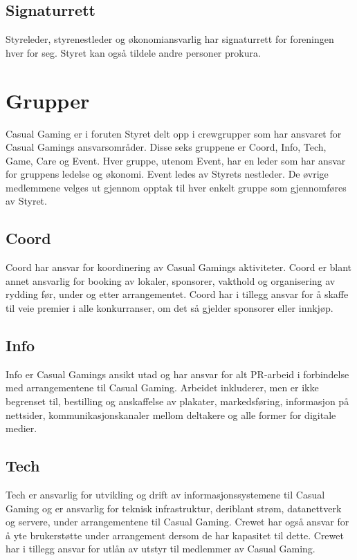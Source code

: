 \subsection{Signaturrett}
Styreleder, styrenestleder og økonomiansvarlig har signaturrett for foreningen hver for seg. Styret kan også tildele andre personer prokura.

\section{Grupper}
Casual Gaming er i foruten Styret delt opp i crewgrupper som har ansvaret for Casual Gamings ansvarsområder. Disse seks gruppene er Coord, Info, Tech, Game, Care og Event. Hver gruppe, utenom Event, har en leder som har ansvar for gruppens ledelse og økonomi. Event ledes av Styrets nestleder. De øvrige medlemmene velges ut gjennom opptak til hver enkelt gruppe som gjennomføres av Styret.

\subsection{Coord}
Coord har ansvar for koordinering av Casual Gamings aktiviteter. Coord er blant annet ansvarlig for booking av lokaler, sponsorer, vakthold og organisering av rydding før, under og etter arrangementet. Coord har i tillegg ansvar for å skaffe til veie premier i alle konkurranser, om det så gjelder sponsorer eller innkjøp.

\subsection{Info}
Info er Casual Gamings ansikt utad og har ansvar for alt PR-arbeid i forbindelse med arrangementene til Casual Gaming. Arbeidet inkluderer, men er ikke begrenset til, bestilling og anskaffelse av plakater, markedsføring, informasjon på nettsider, kommunikasjonskanaler mellom deltakere og alle former for digitale medier.

\subsection{Tech}
Tech er ansvarlig for utvikling og drift av informasjonssystemene til Casual Gaming og er ansvarlig for teknisk infrastruktur, deriblant strøm, datanettverk og servere, under arrangementene til Casual Gaming. Crewet har også ansvar for å yte brukerstøtte under arrangement dersom de har kapasitet til dette. Crewet har i tillegg ansvar for utlån av utstyr til medlemmer av Casual Gaming.


